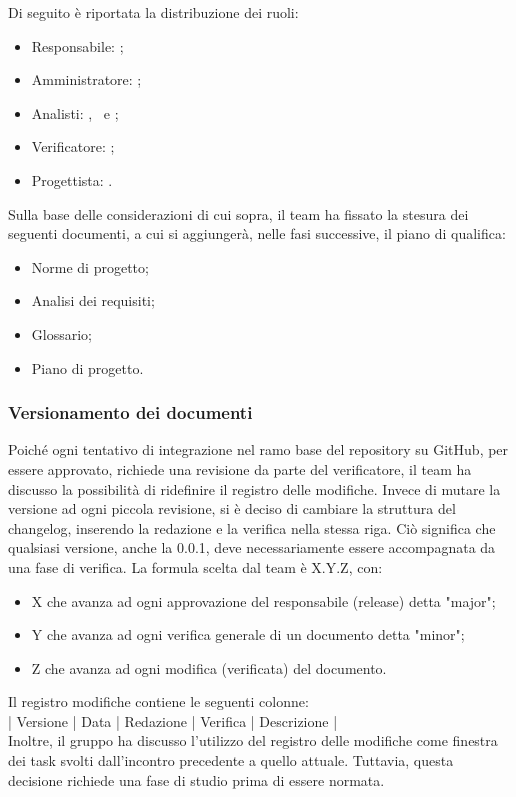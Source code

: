 \vspace{0.5\baselineskip}
Di seguito è riportata la distribuzione dei ruoli:
\begin{itemize}
	\item Responsabile: \riccardo;
	\item Amministratore: \tommaso;
	\item Analisti: \marco, \martina \ e \sebastiano;
	\item Verificatore: \raul;
	\item Progettista: \mattia.
\end{itemize}

\vspace{0.5\baselineskip}
Sulla base delle considerazioni di cui sopra, il team ha fissato la stesura dei seguenti documenti, a cui si aggiungerà, nelle fasi successive, il piano di qualifica:
\begin{itemize}
	\item Norme di progetto;
	\item Analisi dei requisiti;
	\item Glossario;
	\item Piano di progetto.
\end{itemize}

\subsubsection{Versionamento dei documenti} \label{versionamento}
Poiché ogni tentativo di integrazione nel ramo base del repository su GitHub, per essere approvato, richiede una revisione da parte del verificatore, il team ha discusso la possibilità di ridefinire il registro delle modifiche. Invece di mutare la versione ad ogni piccola revisione, si è deciso di cambiare la struttura del changelog,  inserendo la redazione e la verifica nella stessa riga. Ciò significa che qualsiasi versione, anche la 0.0.1, deve necessariamente essere accompagnata da una fase di verifica. La formula scelta dal team è X.Y.Z, con:
\begin{itemize}
	\item X che avanza ad ogni approvazione del responsabile (release) detta "major";
	\item Y che avanza ad ogni verifica generale di un documento detta "minor";
	\item Z che avanza ad ogni modifica (verificata) del documento.
\end{itemize}

\vspace{0.5\baselineskip}
Il registro modifiche contiene le seguenti colonne: \\
\vspace{\baselineskip}
\hspace{1cm} | Versione | Data | Redazione | Verifica | Descrizione | \\
Inoltre, il gruppo ha discusso l'utilizzo del registro delle modifiche come finestra dei task svolti dall'incontro precedente a quello attuale. Tuttavia, questa decisione richiede una fase di studio prima di essere normata.

